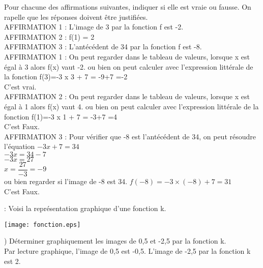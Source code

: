 \documentclass[a4paper,11pt]{article}
\newcounter{numexo}
\newcommand{\exo}[1]{\stepcounter{numexo}\noindent{\bf Exercice~\thenumexo} : \marginpar{\hfill /#1}}
\newcounter{enumtabi}
\newcommand{\q}{\stepcounter{enumtabi} \theenumtabi)  }
\newcommand{\initq}{\setcounter{enumtabi}{0}}
\begin{document}
Pour chacune des affirmations suivantes, indiquer si elle est vraie ou fausse. On rapelle que les réponses doivent être justifiées.\\

AFFIRMATION 1 : L'image de 3 par la fonction f est -2.\\

AFFIRMATION 2 : f(1) = 2\\

AFFIRMATION 3 : L'antécédent de 34 par la fonction f est -8.\\

\color{red}
AFFIRMATION 1 : On peut regarder dans le tableau de valeurs, lorsque x est égal à 3 alors f(x) vaut -2. 
ou bien on peut calculer avec l'expression littérale de la fonction f(3)=-3 x 3 + 7 = -9+7 =-2\\
C'est vrai.\\


AFFIRMATION 2 : On peut regarder dans le tableau de valeurs, lorsque x est égal à 1 alors f(x) vaut 4. 
ou bien on peut calculer avec l'expression littérale de la fonction f(1)=-3 x 1 + 7 = -3+7 =4\\
C'est Faux.\\

AFFIRMATION 3 : Pour vérifier que -8 est l'antécédent  de 34, on peut résoudre l'équation $-3x+7=34$\\

$-3x=34-7$\\
$-3x=27$\\
$x=\dfrac{27}{-3}=-9$\\

ou bien regarder si l'image de -8 est 34. $f(-8)=-3 \times (-8) +7 = 31$\\

C'est Faux.


\color{black}


\newpage

\exo{3} Voisi la représentation graphique d'une fonction k.

\begin{center}
\texttt{[image: fonction.eps]} 
\end{center}

\noindent \initq \q Déterminer graphiquement les images de 0,5 et -2,5 par la fonction k.\\

\color{red}
Par lecture graphique, l'image de 0,5 est -0,5. L'image de -2,5 par la fonction k est 2.\\
\end{document}
